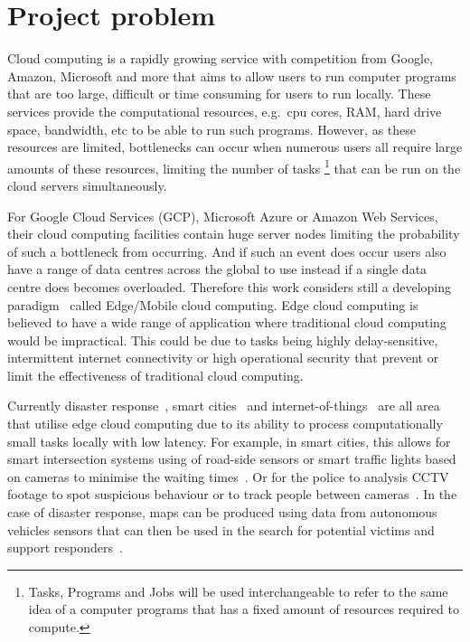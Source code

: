 \chapter{Project problem}\label{ch:project-problem}
Cloud computing is a rapidly growing service with competition from Google, Amazon, Microsoft and more that aims to
allow users to run computer programs that are too large, difficult or time consuming for users to run locally.
These services provide the computational resources, e.g.\ cpu cores, RAM, hard drive space, bandwidth, etc
to be able to run such programs. However, as these resources are limited, bottlenecks can occur when
numerous users all require large amounts of these resources, limiting the number of tasks
\footnote{Tasks, Programs and Jobs will be used interchangeable to refer to the same idea of a computer programs that
has a fixed amount of resources required to compute.} that can be run on the cloud servers simultaneously.

For Google Cloud Services (GCP), Microsoft Azure or Amazon Web Services, their cloud computing facilities contain huge
server nodes limiting the probability of such a bottleneck from occurring. And if such an event does occur users also
have a range of data centres across the global to use instead if a single data centre does becomes overloaded.
Therefore this work considers still a developing paradigm~\citep{mobile_edge_survey} called Edge/Mobile cloud computing.
Edge cloud computing is believed to have a wide range of application where traditional cloud computing would be
impractical. This could be due to tasks being highly delay-sensitive, intermittent internet connectivity
or high operational security that prevent or limit the effectiveness of traditional cloud computing.

Currently disaster response~\citep{mobile_edge_disaster}, smart cities~\citep{smart_disaster_management} and
internet-of-things~\citep{mobile_edge_IoT} are all area that utilise edge cloud computing due to its ability
to process computationally small tasks locally with low latency. For example, in smart cities, this
allows for smart intersection systems using of road-side sensors or smart traffic lights based
on cameras to minimise the waiting times~\citep{smart_cities_traffic_lights}. Or for the police to analysis
CCTV footage to spot suspicious behaviour or to track people between cameras~\citep{Sreenu2019}. In the case
of disaster response, maps can be produced using data from autonomous vehicles sensors that can then be used in the
search for potential victims and support responders~\citep{smart_disaster_management}.


